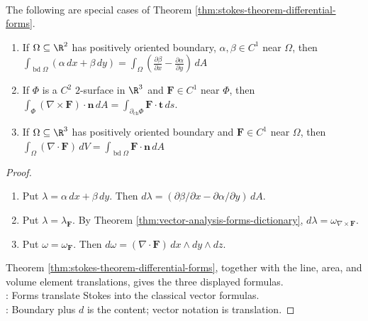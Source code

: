 \begin{theorem} \label{thm:green-stokes-divergence-special-cases} \\
The following are special cases of Theorem \ref{thm:stokes-theorem-differential-forms}.
\begin{enumerate}[label=(\roman*)]
\setlength{\itemsep}{0pt}
\item If $\Omega\subseteq\R^2$ has positively oriented boundary, $\alpha,\beta\in C^1$ near $\Omega$, then $\int_{\operatorname{bd}\Omega}(\alpha\,dx+\beta\,dy) = \int_{\Omega}\left(\frac{\partial\beta}{\partial x}-\frac{\partial\alpha}{\partial y}\right)\,dA$
\item If $\Phi$ is a $C^2$ $2$-surface in $\R^3$ and $\mathbf{F}\in C^1$ near $\Phi$, then $\int_{\Phi}(\nabla\times\mathbf{F})\cdot\mathbf{n}\,dA = \int_{\partial_{\mathrm{ch}}\Phi}\mathbf{F}\cdot\mathbf{t}\,ds$.
\item If $\Omega\subseteq\R^3$ has positively oriented boundary and $\mathbf{F}\in C^1$ near $\Omega$, then $\int_{\Omega}(\nabla\cdot\mathbf{F})\,dV =\int_{\operatorname{bd}\Omega}\mathbf{F}\cdot\mathbf{n}\,dA$
\end{enumerate}
\begin{proof}
\begin{enumerate}[label=(\roman*)]
\setlength{\itemsep}{0pt}
\item Put $\lambda=\alpha\,dx+\beta\,dy$. Then $d\lambda=(\partial\beta/\partial x-\partial\alpha/\partial y)\,dA$.
\item Put $\lambda=\lambda_{\mathbf{F}}$. By Theorem \ref{thm:vector-analysis-forms-dictionary}, $d\lambda=\omega_{\nabla\times\mathbf{F}}$.
\item Put $\omega=\omega_{\mathbf{F}}$. Then $d\omega=(\nabla\cdot\mathbf{F})\,dx\wedge dy\wedge dz$.
\end{enumerate}
Theorem \ref{thm:stokes-theorem-differential-forms}, together with the line, area, and volume element translations, gives the three displayed formulas.\\
: Forms translate Stokes into the classical vector formulas.\\
: Boundary plus $d$ is the content; vector notation is translation.
\end{proof}
\end{theorem}

